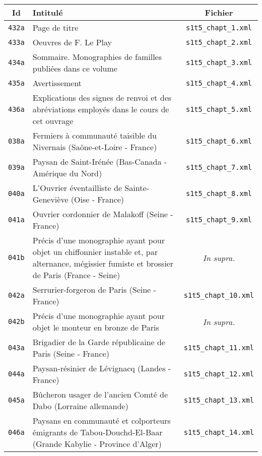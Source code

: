 \begin{center}
\begin{longtable}{ | c | p{9.5cm} | c | }
\hline
Id & Intitulé & Fichier \\ \hline
\texttt{432a} & Page de titre & \texttt{s1t5\_chapt\_1.xml} \\ \hline
\texttt{433a} & Oeuvres de F. Le Play & \texttt{s1t5\_chapt\_2.xml} \\ \hline
\texttt{434a} & Sommaire. Monographies de familles publiées dans ce volume & \texttt{s1t5\_chapt\_3.xml} \\ \hline
\texttt{435a} & Avertissement & \texttt{s1t5\_chapt\_4.xml} \\ \hline
\texttt{436a} & Explications des signes de renvoi et des abréviations employés dans le cours de cet ouvrage & \texttt{s1t5\_chapt\_5.xml} \\ \hline
\texttt{038a} & Fermiers à communauté taisible du Nivernais (Saône-et-Loire - France) & \texttt{s1t5\_chapt\_6.xml} \\ \hline
\texttt{039a} & Paysan de Saint-Irénée (Bas-Canada - Amérique du Nord) & \texttt{s1t5\_chapt\_7.xml} \\ \hline
\texttt{040a} & L'Ouvrier éventailliste de Sainte-Geneviève (Oise - France) & \texttt{s1t5\_chapt\_8.xml} \\ \hline
\texttt{041a} & Ouvrier cordonnier de Malakoff (Seine - France) & \texttt{s1t5\_chapt\_9.xml} \\ \hline
\texttt{041b} & Précis d'une monographie ayant pour objet un chiffonnier instable et, par alternance, mégissier fumiste et brossier de Paris (France - Seine) & \textit{In supra.} \\ \hline
\texttt{042a} & Serrurier-forgeron de Paris (Seine - France) & \texttt{s1t5\_chapt\_10.xml} \\ \hline
\texttt{042b} & Précis d'une monographie ayant pour objet le monteur en bronze de Paris & \textit{In supra.} \\ \hline
\texttt{043a} & Brigadier de la Garde républicaine de Paris (Seine - France) & \texttt{s1t5\_chapt\_11.xml} \\ \hline
\texttt{044a} & Paysan-résinier de Lévignacq (Landes - France) & \texttt{s1t5\_chapt\_12.xml} \\ \hline
\texttt{045a} & Bûcheron usager de l'ancien Comté de Dabo (Lorraine allemande) & \texttt{s1t5\_chapt\_13.xml} \\ \hline
\texttt{046a} & Paysans en communauté et colporteurs émigrants de Tabou-Douchd-El-Baar (Grande Kabylie - Province d'Alger) & \texttt{s1t5\_chapt\_14.xml} \\ \hline

\end{longtable}
\end{center}
